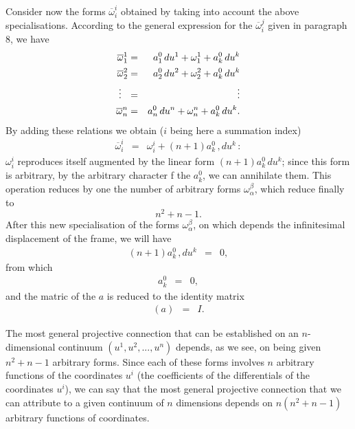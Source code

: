 Consider now the forms $\overline \omega^i_i$ obtained by taking into account the above specialisations. According to the general expression for the $\overline \omega^j_i$ given in paragraph 8, we have 
\begin{eqnarray*}
\overline \omega^1_1 &=& a^0_1\, du^1 + \omega^1_1 + a^0_k\, du^k
\\
\overline \omega^2_2 &=& a^0_2\, du^2 + \omega^2_2 + a^0_k\, du^k
\\
\vdots\ \   &=& \hspace*{1.6cm} \vdots
\\
\overline \omega^n_n &=& a^0_n\, du^n + \omega^n_n + a^0_k\, du^k.
\end{eqnarray*}
By adding these relations we obtain ($i$ being here a summation index)
\begin{eqnarray*}
\overline \omega^i_i &=&  \omega^i_i + (n+1) a^0_k\,, du^k\, :
\end{eqnarray*}
$\omega^i_i$ reproduces itself augmented by the linear form $(n+1) a^0_k\, du^k$; since this form is arbitrary, by the arbitrary character f the $a^0_k$, we can annihilate them. This operation reduces by one the number of arbitrary forms $\omega^\beta_\alpha$, which reduce finally to 
$$  n^2 + n -1. $$
After this new specialisation of the forms $\omega^\beta_\alpha$, on which depends the infinitesimal displacement of the frame, we will have 
\begin{eqnarray*}
(n+1) a^0_k\,, du^k &=& 0,
\end{eqnarray*}
from which 
\begin{eqnarray*}
a^0_k &=& 0,
\end{eqnarray*}
and the matric of the $a$ is reduced to the identity matrix
\begin{eqnarray*}
(a) &=& I .
\end{eqnarray*}

The most general projective connection that can be established on an $n$-dimensional continuum $(u^1, u^2, ..., u^n)$ depends, as we see, on being given $n^2+n-1$ arbitrary forms. Since each of these forms involves $n$ arbitrary functions of the coordinates $u^i$ (the coefficients of the differentials of the coordinates $u^i$), we can say that the most general projective connection that we can attribute to a
given continuum of $n$ dimensions depends on $n(n^2+n-1)$  arbitrary functions of coordinates.

